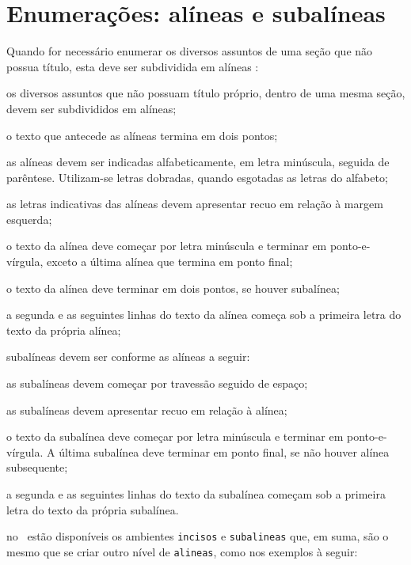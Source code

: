 \section{Enumerações: alíneas e subalíneas}

Quando for necessário enumerar os diversos assuntos de uma seção que não possua título, esta deve ser
subdividida em alíneas \cite[seção 4.2]{NBR6024:2012}:

\begin{alineas}

  \item os diversos assuntos que não possuam título próprio, dentro de uma mesma seção, devem ser subdivididos em alíneas; 
  \item o texto que antecede as alíneas termina em dois pontos;
  \item as alíneas devem ser indicadas alfabeticamente, em letra minúscula, seguida de parêntese. Utilizam-se letras dobradas, quando esgotadas as letras do alfabeto;
  \item as letras indicativas das alíneas devem apresentar recuo em relação à margem esquerda;
  \item o texto da alínea deve começar por letra minúscula e terminar em ponto-e-vírgula, exceto a última alínea que termina em ponto final;
  \item o texto da alínea deve terminar em dois pontos, se houver subalínea;
  \item a segunda e as seguintes linhas do texto da alínea começa sob a primeira letra do texto da própria alínea;
  \item subalíneas \cite[seção 4.3]{NBR6024:2012} devem ser conforme as alíneas a   seguir:

  \begin{alineas}
     \item as subalíneas devem começar por travessão seguido de espaço;
     \item as subalíneas devem apresentar recuo em relação à alínea;
     \item o texto da subalínea deve começar por letra minúscula e terminar em ponto-e-vírgula. A última subalínea deve terminar em ponto final, se não houver alínea subsequente;
     \item a segunda e as seguintes linhas do texto da subalínea começam sob a primeira letra do texto da própria subalínea.
  \end{alineas}
  
  \item no \abnTeX\ estão disponíveis os ambientes \texttt{incisos} e  \texttt{subalineas} que, em suma, são o mesmo que se criar outro nível de \texttt{alineas}, como nos exemplos à seguir:
  

\end{alineas}
